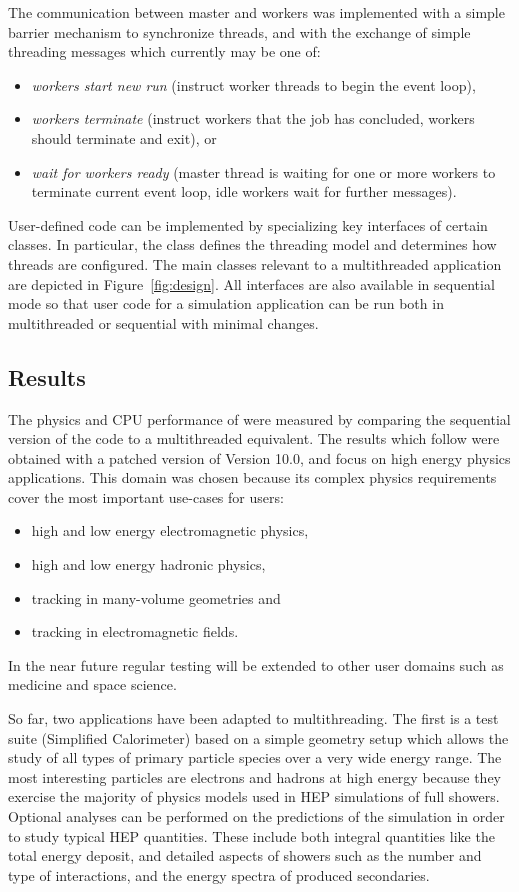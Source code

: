The communication between master and workers was implemented with a simple 
barrier mechanism to synchronize threads, and with the exchange of simple 
threading messages which currently may be one of:
\begin{itemize} 
\item {\it workers start new run} (instruct worker threads to begin the event
      loop),
\item {\it workers terminate} (instruct workers that the job has concluded, 
      workers should terminate and exit), or
\item {\it wait for workers ready} (master thread is waiting for one or more 
      workers to terminate current event loop, idle workers wait for further 
      messages).
\end{itemize}
User-defined code can be implemented by specializing key interfaces of certain
classes.  In particular, the  
class defines the threading model and determines how threads are configured.  
The main \Gfour{} classes relevant to a multithreaded application are depicted
in Figure~\ref{fig:design}.  All interfaces are also available in sequential 
mode so that user code for a simulation application can be run both in 
multithreaded or sequential \Gfour{} with minimal changes.

\subsection{\textbf{Results}}
The physics and CPU performance of \Gfour{} were measured by comparing the
sequential version of the code to a multithreaded equivalent.  The results which
follow were obtained with a patched version of \Gfour{} Version 10.0, and 
focus on high energy physics applications.  This domain was chosen because its 
complex physics requirements cover the most important use-cases for \Gfour{} 
users:
\begin{itemize}
\item high and low energy electromagnetic physics,
\item high and low energy hadronic physics, 
\item tracking in many-volume geometries and
\item tracking in electromagnetic fields.
\end{itemize}
In the near future regular testing will be extended to other user domains such
as medicine and space science.

So far, two applications have been adapted to multithreading.  The first is a 
test suite (Simplified Calorimeter) based on a simple geometry setup which allows
the study of all types of primary particle species over a very wide energy
range\cite{MT:6154433}.  The most interesting particles are electrons and hadrons
at high energy because they exercise the majority of physics models used in HEP
simulations of full showers.  Optional analyses can be performed on the 
predictions of the simulation in order to study typical HEP quantities.  These 
include both integral quantities like the total energy deposit, and detailed 
aspects of showers such as the number and type of interactions, and the energy 
spectra of produced secondaries.

